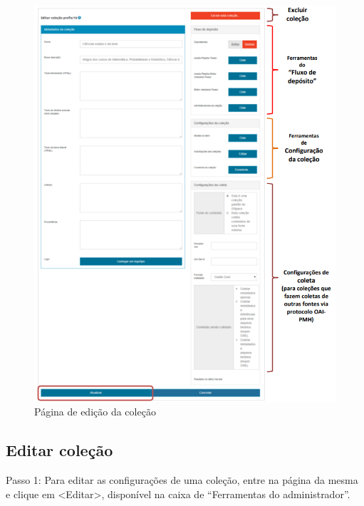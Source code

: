 \documentclass[12pt,hidelinks]{article}
\begin{document}
    \begin{figure}[!htp]
                \centering
                \includegraphics[scale=0.9]{figura/Figura39.png}
                \caption{Página de edição da coleção}
            \label{Rotulo}
        \end{figure}
    
\newpage

    \subsection{Editar coleção}
    
    Passo 1: Para editar as configurações de uma coleção, entre na página da mesma e clique em <Editar>, disponível na caixa de “Ferramentas do administrador”.
        
    
    
    
    
    
    
    
    
\end{document}
